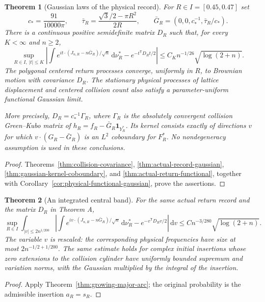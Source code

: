 \documentclass[11pt,reqno]{amsart}
\numberwithin{equation}{section}
\newtheorem{maintheorem}{Theorem}
\theoremstyle{definition}\newtheorem{definition}[theorem]{Definition}
\theoremstyle{remark}\newtheorem{remark}[theorem]{Remark}
\newcommand{\dd}{\,\mathrm d}\newcommand{\one}{\mathbf1}
\begin{document}
\begin{maintheorem}[Gaussian laws of the physical record]
\label{thm:intro-gaussian}
For $R\in I=[0.45,0.47]$ set
\[
 c_* = \frac{91}{10000\pi},\qquad
 \bar\tau_R=\frac{\sqrt3/2-\pi R^2}{2R},\qquad
 \bar G_R=(0,0,c_*^{-1},\bar\tau_R/c_*).
\]
There is a continuous positive semidefinite matrix $D_R$ such that,
for every $K<\infty$ and $n\ge2$,
\[
 \sup_{R\in I,\ |t|\le K}
 \left|\int e^{it\cdot(J_{n,R}-n\bar G_R)/\sqrt n}\dd\nu_R^*
              -e^{-t^{\mathsf T}D_Rt/2}\right|
 \le C_Kn^{-1/26}\sqrt{\log(2+n)}.
\]
The polygonal centered return processes converge, uniformly in $R$,
to Brownian motion with covariance $D_R$. The stationary physical
processes of lattice displacement and centered collision count also
satisfy a parameter-uniform functional Gaussian limit.

More precisely, $D_R=c_*^{-1}\Gamma_R$, where $\Gamma_R$ is the
absolutely convergent collision Green--Kubo matrix of
$h_R=f_R-\bar G_R\one_{Y_R^*}$. Its kernel consists exactly of directions
$v$ for which $v\cdot(G_R-\bar G_R)$ is an $L^2$ coboundary for
$F_R^*$. No nondegeneracy assumption is used in these conclusions.
\end{maintheorem}
\begin{proof}
Theorems~\ref{thm:collision-covariance},
\ref{thm:actual-record-gaussian}, \ref{thm:gaussian-kernel-coboundary},
and \ref{thm:actual-return-functional}, together with
Corollary~\ref{cor:physical-functional-gaussian}, prove the assertions.
\end{proof}

\begin{maintheorem}[An integrated central band]
\label{thm:intro-major-arc}
For the same actual return record and the matrix $D_R$ in Theorem A,
\[
 \sup_{R\in I}\int_{|v|\le2n^{1/200}}
 \left|\int e^{iv\cdot(J_{n,R}-n\bar G_R)/\sqrt n}\dd\nu_R^*
                       -e^{-v^{\mathsf T}D_Rv/2}\right|\dd v
       \le Cn^{-3/280}\sqrt{\log(2+n)}.
\]
The variable $v$ is rescaled: the corresponding physical frequencies
have size at most $2n^{-1/2+1/200}$. The same estimate holds for complex
initial insertions whose zero extensions to the collision cylinder
have uniformly bounded supremum and variation norms, with the Gaussian
multiplied by the integral of the insertion.
\end{maintheorem}
\begin{proof}
Apply Theorem~\ref{thm:growing-major-arc}; the original probability is
the admissible insertion $a_R=s_R$.
\end{proof}
\end{document}

